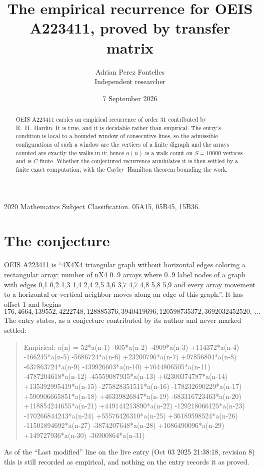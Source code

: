 \documentclass[11pt,a4paper]{article}
\title{The empirical recurrence for OEIS A223411, proved by transfer matrix}
\author{Adrian Perez Fontelles\\ \small Independent researcher}
\date{7 September 2026}
\theoremstyle{plain}
\theoremstyle{definition}
\begin{document}
\maketitle

\begin{abstract}
OEIS A223411 carries an empirical recurrence of order $31$ contributed by R.~H.~Hardin. It is
true, and it is decidable rather than empirical. The entry's condition is local to a bounded window of consecutive lines, so
the admissible configurations of such a window are the vertices of a finite digraph and the
arrays counted are exactly the walks in it; hence $a(n)$ is a walk count on $S=10000$ vertices
and is $C$-finite. Whether the conjectured recurrence annihilates it is then settled by a
finite exact computation, with the Cayley--Hamilton theorem bounding the work.
\end{abstract}

\noindent\small 2020 Mathematics Subject Classification. 05A15, 05B45, 15B36.\normalsize

\section{The conjecture}

OEIS A223411 is ``4X4X4 triangular graph without horizontal edges coloring a rectangular array: number of nX4 0..9 arrays where 0..9 label nodes of a graph with edges 0,1 0,2 1,3 1,4 2,4 2,5 3,6 3,7 4,7 4,8 5,8 5,9 and every array movement to a horizontal or vertical neighbor moves along an edge of this graph.''. It has offset $1$ and begins
\[
176, 4664, 139552, 4222748, 128885376, 3940419696, 120598735372, 3692032452520,\ \dots
\]
The entry states, as a conjecture contributed by its author and never marked settled:
\begin{quote}
Empirical: a(n) = 52*a(n-1) -605*a(n-2) -4909*a(n-3) +114372*a(n-4) -166245*a(n-5) -5686724*a(n-6) +23200796*a(n-7) +97856804*a(n-8) -637863724*a(n-9) -439926603*a(n-10) +7644806505*a(n-11) -4787204618*a(n-12) -45559087935*a(n-13) +62300374787*a(n-14) +135392995419*a(n-15) -275828351511*a(n-16) -178232690229*a(n-17) +590906665851*a(n-18) +46339826847*a(n-19) -683316723463*a(n-20) +118854244655*a(n-21) +449144213890*a(n-22) -129218066125*a(n-23) -170266844243*a(n-24) +55576426310*a(n-25) +36189598524*a(n-26) -11501894692*a(n-27) -3874207648*a(n-28) +1086490096*a(n-29) +149727936*a(n-30) -36900864*a(n-31)
\end{quote}
As of the ``Last modified'' line on the live entry (Oct 03 2025 21:38:18, revision 8) this is still
recorded as empirical, and nothing on the entry records it as proved.
\end{document}
